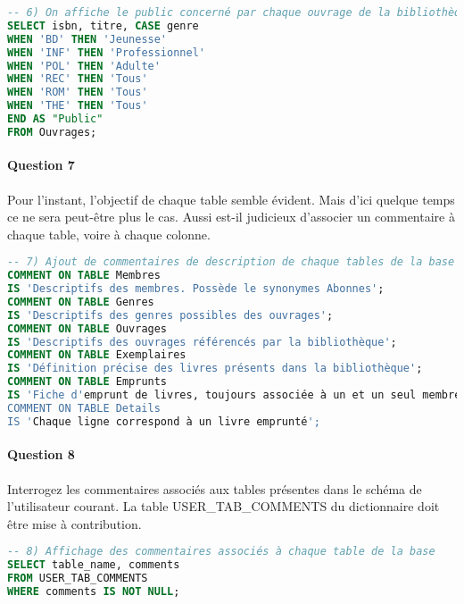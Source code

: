 \documentclass[10pt, oneside]{article}
\begin{document}
\begin{lstlisting}[language=sql, title=Question 6, label=QIII6]
-- 6) On affiche le public concerné par chaque ouvrage de la bibliothèque
SELECT isbn, titre, CASE genre
WHEN 'BD' THEN 'Jeunesse'
WHEN 'INF' THEN 'Professionnel'
WHEN 'POL' THEN 'Adulte'
WHEN 'REC' THEN 'Tous'
WHEN 'ROM' THEN 'Tous'
WHEN 'THE' THEN 'Tous'
END AS "Public"
FROM Ouvrages;
\end{lstlisting}


\paragraph{Question 7} Pour l'instant, l'objectif de chaque table semble évident. Mais d'ici quelque temps ce ne sera peut-être plus le cas. Aussi est-il judicieux d'associer un commentaire à chaque table, voire à chaque colonne.

\begin{lstlisting}[language=sql, title=Question 7, label=QIII7]
-- 7) Ajout de commentaires de description de chaque tables de la base
COMMENT ON TABLE Membres
IS 'Descriptifs des membres. Possède le synonymes Abonnes';
COMMENT ON TABLE Genres
IS 'Descriptifs des genres possibles des ouvrages';
COMMENT ON TABLE Ouvrages
IS 'Descriptifs des ouvrages référencés par la bibliothèque';
COMMENT ON TABLE Exemplaires
IS 'Définition précise des livres présents dans la bibliothèque';
COMMENT ON TABLE Emprunts
IS 'Fiche d'emprunt de livres, toujours associée à un et un seul membre';
COMMENT ON TABLE Details
IS 'Chaque ligne correspond à un livre emprunté';
\end{lstlisting}


\paragraph{Question 8} Interrogez les commentaires associés aux tables présentes dans le schéma de l'utilisateur courant. La table USER\_TAB\_COMMENTS du dictionnaire doit être mise à contribution.

\begin{lstlisting}[language=sql, title=Question 8, label=QIII8]
-- 8) Affichage des commentaires associés à chaque table de la base
SELECT table_name, comments
FROM USER_TAB_COMMENTS
WHERE comments IS NOT NULL;
\end{lstlisting}

\end{document}
